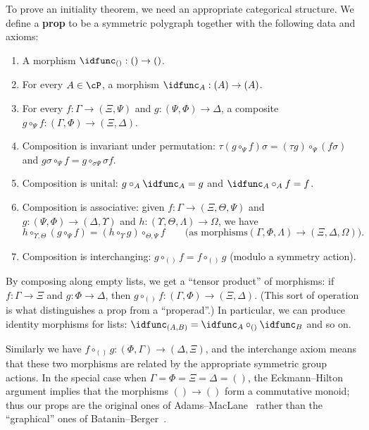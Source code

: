 To prove an initiality theorem, we need an appropriate categorical structure.
We define a \textbf{prop} to be a symmetric polygraph \cP together with the following data and axioms:
\begin{enumerate}
\item A morphism $\idfunc_{()}:()\to ()$.
\item For every $A\in\cP$, a morphism $\idfunc_A :(A)\to (A)$.
\item For every $f:\Gamma\to (\Xi,\Psi)$ and $g:(\Psi,\Phi)\to \Delta$, a composite $g\circ_\Psi f : (\Gamma,\Phi) \to (\Xi,\Delta)$.
\item Composition is invariant under permutation: $\tau(g\circ_\Psi f)\sigma = (\tau g)\circ_\Psi (f\sigma)$ and $g\sigma \circ_\Psi f = g\circ_{\sigma \Psi} \sigma f$.
\item Composition is unital:
  $g\circ_A \idfunc_A = g$ and $\idfunc_A\circ_A f = f$.
\item Composition is associative: given $f:\Gamma\to (\Xi,\Theta,\Psi)$ and $g:(\Psi,\Phi)\to (\Delta,\Upsilon)$ and $h:(\Upsilon,\Theta,\Lambda)\to \Omega$, we have
  \[h \circ_{\Upsilon,\Theta} (g\circ_\Psi f) = (h\circ_\Upsilon g) \circ_{\Theta,\Psi} f \qquad \text{(as morphisms} (\Gamma,\Phi,\Lambda) \to (\Xi,\Delta,\Omega)). \]
\item Composition is interchanging: $g\circ_{()}f = f\circ_{()}g$ (modulo a symmetry action).
\end{enumerate}
By composing along empty lists, we get a ``tensor product'' of morphisms: if $f:\Gamma\to\Xi$ and $g:\Phi\to\Delta$, then $g\circ_{()}f : (\Gamma,\Phi) \to (\Xi,\Delta)$.
(This sort of operation is what distinguishes a prop from a ``properad''.)
In particular, we can produce identity morphisms for lists: $\idfunc_{(A,B)} = \idfunc_A \circ_{()} \idfunc_B$ and so on.

Similarly we have $f\circ_{()}g : (\Phi,\Gamma) \to (\Delta,\Xi)$, and the interchange axiom means that these two morphisms are related by the appropriate symmetric group actions.
In the special case when $\Gamma=\Phi=\Xi=\Delta=()$, the Eckmann--Hilton argument implies that the morphisms $()\to ()$ form a commutative monoid; thus our props are the original ones of Adams--MacLane~\cite{maclane:natural-assoc,maclane:cat-alg} rather than the ``graphical'' ones of Batanin--Berger~\cite{bb:htapm}.

